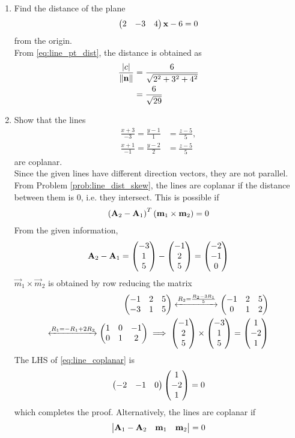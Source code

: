 \documentclass[journal,12pt,twocolumn]{IEEEtran}
\renewcommand\thesection{\arabic{section}}
\begin{document}
\begin{enumerate}[label=\thesection.\arabic*.,ref=\thesection.\theenumi]
\item Find the distance of the plane 
\begin{align}
\begin{pmatrix}2 & -3 & 4\end{pmatrix}\mathbf{x}-6  = 0
\end{align}
%
from the origin.
\\
\solution From \eqref{eq:line_pt_dist}, the distance is obtained as
%
\begin{align}
\frac{\left\vert c\right\vert}{\left\lVert\mathbf{n}\right\rVert} &= \frac{6}{\sqrt{2^2+3^2+4^2}}
\\
&= \frac{6}{\sqrt{29}}
\end{align}
%

\item Show that the lines 
\label{prob:line_coplanar}
%
\begin{align}
\frac{x+3}{-3} = \frac{y-1}{1} &= \frac{z-5}{5}, 
\\
\frac{x+1}{-1} = \frac{y-2}{2} &= \frac{z-5}{5} 
\end{align}
%
are coplanar.
\\
\solution Since the given lines have different direction vectors, they are not parallel.  From Problem \eqref{prob:line_dist_skew}, the lines are coplanar if the distance between them is 0, i.e. they intersect.  This is possible if 
%
\begin{align}
\label{eq:line_coplanar}
\left(\mathbf{A}_2-\mathbf{A}_1\right)^T\left(\mathbf{m}_1\times\mathbf{m}_2\right) = 0
\end{align}
%
From the given information, 
%
\begin{align}
\mathbf{A}_2-\mathbf{A}_1 = \begin{pmatrix}-3\\1\\5\end{pmatrix}-\begin{pmatrix}-1\\2\\5\end{pmatrix} = \begin{pmatrix}-2\\-1\\0\end{pmatrix}
\end{align}
%
$\vec{m}_1\times \vec{m}_2$ is obtained by row reducing the matrix
%
\begin{align}
\begin{pmatrix}
-1 & 2 & 5
\\
-3 & 1 & 5
\end{pmatrix}
\xleftrightarrow[]{R_2=\frac{R_2-3R_1}{5}}
\begin{pmatrix}
-1 & 2 & 5
\\
0 & 1 & 2
\end{pmatrix}
\\
\xleftrightarrow[]{R_1=-R_1+2R_2}
\begin{pmatrix}
1 & 0 & -1
\\
0 & 1 & 2
\end{pmatrix}
\implies \begin{pmatrix}-1 \\ 2 \\ 5\end{pmatrix}
\times \begin{pmatrix}-3 \\ 1 \\ 5\end{pmatrix}
=\begin{pmatrix}1\\-2\\1\end{pmatrix}
\end{align}
%
The LHS of \eqref{eq:line_coplanar} is 
\begin{align}
\begin{pmatrix}-2 & -1 & 0\end{pmatrix}
\begin{pmatrix}1\\-2\\1\end{pmatrix} = 0
\end{align}
%
which completes the proof.  Alternatively, the lines are coplanar if
%
\begin{align}
\begin{vmatrix}\mathbf{A}_1-\mathbf{A}_2 & \mathbf{m}_1 & \mathbf{m}_2\end{vmatrix} = 0
\end{align}
%


\end{enumerate}
\end{document}
